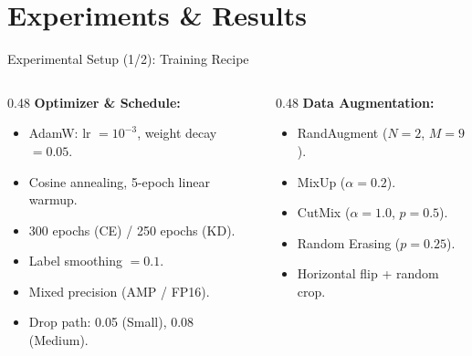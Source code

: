 \documentclass{beamer}
\begin{document}
\section{Experiments \& Results}

\begin{frame}{Experimental Setup (1/2): Training Recipe}
  \begin{columns}[T]
    \begin{column}{0.48\textwidth}
      \textbf{Optimizer \& Schedule:}
      \begin{itemize}\setlength\itemsep{5pt}
        \item AdamW: lr $= 10^{-3}$, weight decay $= 0.05$.
        \item Cosine annealing, 5-epoch linear warmup.
        \item 300 epochs (CE) / 250 epochs (KD).
        \item Label smoothing $= 0.1$.
        \item Mixed precision (AMP / FP16).
        \item Drop path: 0.05 (Small), 0.08 (Medium).
      \end{itemize}
    \end{column}
    \begin{column}{0.48\textwidth}
      \textbf{Data Augmentation:}
      \begin{itemize}\setlength\itemsep{5pt}
        \item RandAugment ($N\!=\!2$, $M\!=\!9$).
        \item MixUp ($\alpha\!=\!0.2$).
        \item CutMix ($\alpha\!=\!1.0$, $p\!=\!0.5$).
        \item Random Erasing ($p\!=\!0.25$).
        \item Horizontal flip + random crop.
      \end{itemize}
    \end{column}
  \end{columns}
\end{frame}
\end{document}
